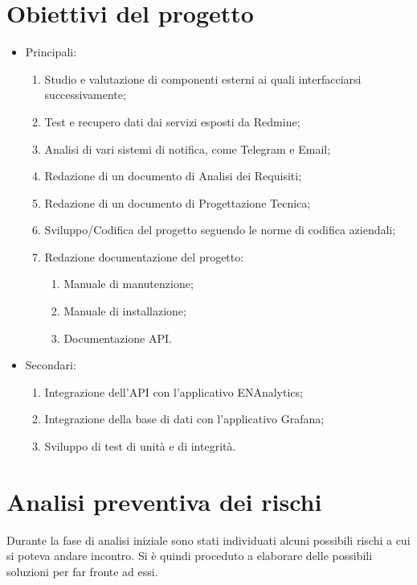 \section{Obiettivi del progetto}
\begin{itemize}
	\item Principali:
	\begin{enumerate}
		\item Studio e valutazione di componenti esterni ai quali interfacciarsi successivamente;
		\item Test e recupero dati dai servizi esposti da Redmine;
		\item Analisi di vari sistemi di notifica, come Telegram e Email;
		\item Redazione di un documento di Analisi dei Requisiti;
		\item Redazione di un documento di Progettazione Tecnica;
		\item Sviluppo/Codifica del progetto seguendo le norme di codifica aziendali;
		\item Redazione documentazione del progetto:
		\begin{enumerate}
			\item Manuale di manutenzione;
			\item Manuale di installazione;
			\item Documentazione API.
		\end{enumerate}
	\end{enumerate}
	\item Secondari:
	\begin{enumerate}
		\item Integrazione dell'API con l'applicativo ENAnalytics;
		\item Integrazione della base di dati con l'applicativo Grafana;
		\item Sviluppo di test di unità e di integrità.
	\end{enumerate}
\end{itemize}


\section{Analisi preventiva dei rischi}

Durante la fase di analisi iniziale sono stati individuati alcuni possibili rischi a cui si poteva andare incontro.
Si è quindi proceduto a elaborare delle possibili soluzioni per far fronte ad essi.\\


